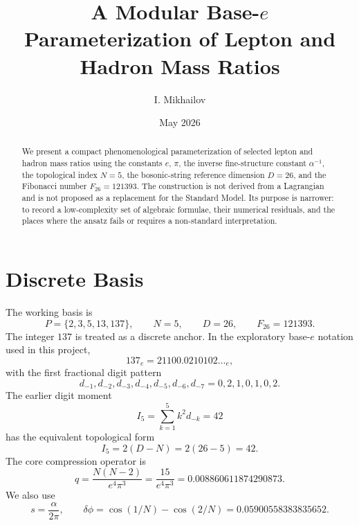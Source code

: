 \documentclass[11pt]{article}
\title{A Modular Base-$e$ Parameterization of Lepton and Hadron Mass Ratios}
\author{I. Mikhailov}
\date{May 2026}
\begin{document}
\maketitle

\begin{abstract}
We present a compact phenomenological parameterization of selected lepton and
hadron mass ratios using the constants $e$, $\pi$, the inverse fine-structure
constant $\alpha^{-1}$, the topological index $N=5$, the bosonic-string
reference dimension $D=26$, and the Fibonacci number $F_{26}=121393$.  The
construction is not derived from a Lagrangian and is not proposed as a
replacement for the Standard Model.  Its purpose is narrower: to record a
low-complexity set of algebraic formulae, their numerical residuals, and the
places where the ansatz fails or requires a non-standard interpretation.
\end{abstract}

\section{Discrete Basis}

The working basis is
\begin{equation}
    P=\{2,3,5,13,137\}, \qquad N=5,\qquad D=26,\qquad F_{26}=121393.
\end{equation}
The integer $137$ is treated as a discrete anchor.  In the exploratory
base-$e$ notation used in this project,
\begin{equation}
    137_e = 21100.0210102\ldots_e ,
\end{equation}
with the first fractional digit pattern
\begin{equation}
    d_{-1},d_{-2},d_{-3},d_{-4},d_{-5},d_{-6},d_{-7}
    =
    0,2,1,0,1,0,2.
\end{equation}
The earlier digit moment
\begin{equation}
    I_5=\sum_{k=1}^{5}k^2d_{-k}=42
\end{equation}
has the equivalent topological form
\begin{equation}
    I_5=2(D-N)=2(26-5)=42.
\end{equation}
The core compression operator is
\begin{equation}
    q = \frac{N(N-2)}{e^4\pi^3}
      = \frac{15}{e^4\pi^3}
      =0.008860611874290873.
\end{equation}
We also use
\begin{equation}
    s=\frac{\alpha}{2\pi}, \qquad
    \delta\phi=\cos(1/N)-\cos(2/N)=0.05900558383835652.
\end{equation}
\end{document}
